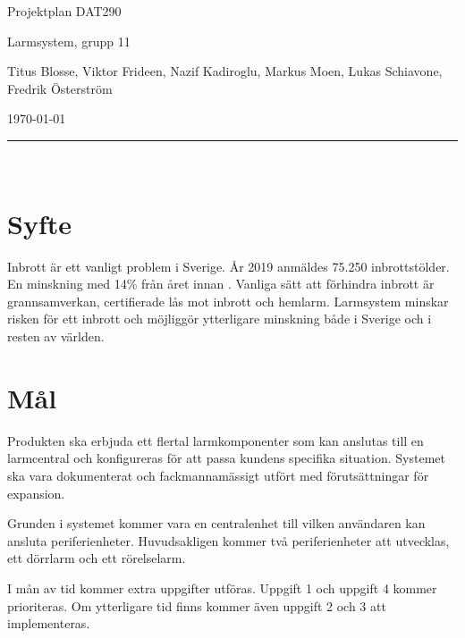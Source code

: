 \documentclass[a4paper]{article}
\newcommand\namn{Larmsystem}
\begin{document}
\thispagestyle{empty}

\begin{center}
    \parskip=14pt
    \vspace*{3\parskip}

    {\LARGE Projektplan DAT290}

    {\large \namn, grupp 11

    Titus Blosse, Viktor Frideen, Nazif Kadiroglu, Markus Moen, Lukas Schiavone, Fredrik Österström

    \today}

    \rule{7cm}{0.4pt}\\
\end{center}
\newpage

\thispagestyle{empty}

\tableofcontents
\newpage



\section{Syfte}
Inbrott är ett vanligt problem i Sverige. År 2019 anmäldes 75.250 inbrottstölder. En minskning med 14\% från året innan \cite{brastold}. Vanliga sätt att förhindra inbrott är grannsamverkan, certifierade lås mot inbrott och hemlarm. Larmsystem minskar risken för ett inbrott och möjliggör ytterligare minskning både i Sverige och i resten av världen.

\section{Mål}

Produkten ska erbjuda ett flertal larmkomponenter som kan anslutas till en larmcentral och konfigureras för att passa kundens specifika situation. Systemet ska vara dokumenterat och fackmannamässigt utfört med förutsättningar för expansion.

Grunden i systemet kommer vara en centralenhet till vilken användaren kan ansluta periferienheter. Huvudsakligen kommer två periferienheter att utvecklas, ett dörrlarm och ett rörelselarm.

I mån av tid kommer extra uppgifter utföras. Uppgift 1 och uppgift 4 kommer prioriteras. Om ytterligare tid finns kommer även uppgift 2 och 3 att implementeras.

\end{document}
